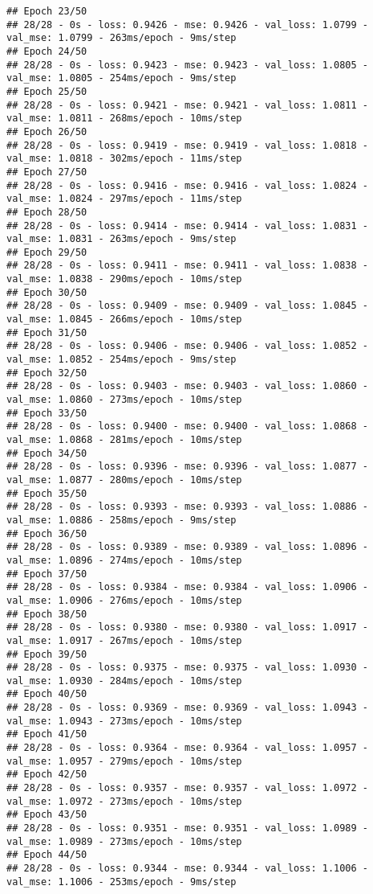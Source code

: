 \documentclass[
]{article}
\begin{document}
\begin{verbatim}
## Epoch 23/50
## 28/28 - 0s - loss: 0.9426 - mse: 0.9426 - val_loss: 1.0799 - val_mse: 1.0799 - 263ms/epoch - 9ms/step
## Epoch 24/50
## 28/28 - 0s - loss: 0.9423 - mse: 0.9423 - val_loss: 1.0805 - val_mse: 1.0805 - 254ms/epoch - 9ms/step
## Epoch 25/50
## 28/28 - 0s - loss: 0.9421 - mse: 0.9421 - val_loss: 1.0811 - val_mse: 1.0811 - 268ms/epoch - 10ms/step
## Epoch 26/50
## 28/28 - 0s - loss: 0.9419 - mse: 0.9419 - val_loss: 1.0818 - val_mse: 1.0818 - 302ms/epoch - 11ms/step
## Epoch 27/50
## 28/28 - 0s - loss: 0.9416 - mse: 0.9416 - val_loss: 1.0824 - val_mse: 1.0824 - 297ms/epoch - 11ms/step
## Epoch 28/50
## 28/28 - 0s - loss: 0.9414 - mse: 0.9414 - val_loss: 1.0831 - val_mse: 1.0831 - 263ms/epoch - 9ms/step
## Epoch 29/50
## 28/28 - 0s - loss: 0.9411 - mse: 0.9411 - val_loss: 1.0838 - val_mse: 1.0838 - 290ms/epoch - 10ms/step
## Epoch 30/50
## 28/28 - 0s - loss: 0.9409 - mse: 0.9409 - val_loss: 1.0845 - val_mse: 1.0845 - 266ms/epoch - 10ms/step
## Epoch 31/50
## 28/28 - 0s - loss: 0.9406 - mse: 0.9406 - val_loss: 1.0852 - val_mse: 1.0852 - 254ms/epoch - 9ms/step
## Epoch 32/50
## 28/28 - 0s - loss: 0.9403 - mse: 0.9403 - val_loss: 1.0860 - val_mse: 1.0860 - 273ms/epoch - 10ms/step
## Epoch 33/50
## 28/28 - 0s - loss: 0.9400 - mse: 0.9400 - val_loss: 1.0868 - val_mse: 1.0868 - 281ms/epoch - 10ms/step
## Epoch 34/50
## 28/28 - 0s - loss: 0.9396 - mse: 0.9396 - val_loss: 1.0877 - val_mse: 1.0877 - 280ms/epoch - 10ms/step
## Epoch 35/50
## 28/28 - 0s - loss: 0.9393 - mse: 0.9393 - val_loss: 1.0886 - val_mse: 1.0886 - 258ms/epoch - 9ms/step
## Epoch 36/50
## 28/28 - 0s - loss: 0.9389 - mse: 0.9389 - val_loss: 1.0896 - val_mse: 1.0896 - 274ms/epoch - 10ms/step
## Epoch 37/50
## 28/28 - 0s - loss: 0.9384 - mse: 0.9384 - val_loss: 1.0906 - val_mse: 1.0906 - 276ms/epoch - 10ms/step
## Epoch 38/50
## 28/28 - 0s - loss: 0.9380 - mse: 0.9380 - val_loss: 1.0917 - val_mse: 1.0917 - 267ms/epoch - 10ms/step
## Epoch 39/50
## 28/28 - 0s - loss: 0.9375 - mse: 0.9375 - val_loss: 1.0930 - val_mse: 1.0930 - 284ms/epoch - 10ms/step
## Epoch 40/50
## 28/28 - 0s - loss: 0.9369 - mse: 0.9369 - val_loss: 1.0943 - val_mse: 1.0943 - 273ms/epoch - 10ms/step
## Epoch 41/50
## 28/28 - 0s - loss: 0.9364 - mse: 0.9364 - val_loss: 1.0957 - val_mse: 1.0957 - 279ms/epoch - 10ms/step
## Epoch 42/50
## 28/28 - 0s - loss: 0.9357 - mse: 0.9357 - val_loss: 1.0972 - val_mse: 1.0972 - 273ms/epoch - 10ms/step
## Epoch 43/50
## 28/28 - 0s - loss: 0.9351 - mse: 0.9351 - val_loss: 1.0989 - val_mse: 1.0989 - 273ms/epoch - 10ms/step
## Epoch 44/50
## 28/28 - 0s - loss: 0.9344 - mse: 0.9344 - val_loss: 1.1006 - val_mse: 1.1006 - 253ms/epoch - 9ms/step

\end{verbatim}
\end{document}
